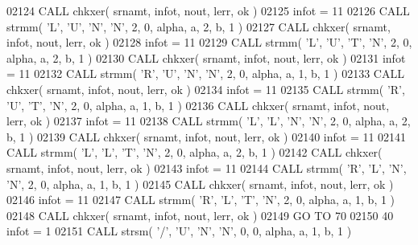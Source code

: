 \begin{DoxyCode}
02124       \textcolor{keyword}{CALL }chkxer( srnamt, infot, nout, lerr, ok )
02125       infot = 11
02126       \textcolor{keyword}{CALL }strmm( \textcolor{stringliteral}{'L'}, \textcolor{stringliteral}{'U'}, \textcolor{stringliteral}{'N'}, \textcolor{stringliteral}{'N'}, 2, 0, alpha, a, 2, b, 1 )
02127       \textcolor{keyword}{CALL }chkxer( srnamt, infot, nout, lerr, ok )
02128       infot = 11
02129       \textcolor{keyword}{CALL }strmm( \textcolor{stringliteral}{'L'}, \textcolor{stringliteral}{'U'}, \textcolor{stringliteral}{'T'}, \textcolor{stringliteral}{'N'}, 2, 0, alpha, a, 2, b, 1 )
02130       \textcolor{keyword}{CALL }chkxer( srnamt, infot, nout, lerr, ok )
02131       infot = 11
02132       \textcolor{keyword}{CALL }strmm( \textcolor{stringliteral}{'R'}, \textcolor{stringliteral}{'U'}, \textcolor{stringliteral}{'N'}, \textcolor{stringliteral}{'N'}, 2, 0, alpha, a, 1, b, 1 )
02133       \textcolor{keyword}{CALL }chkxer( srnamt, infot, nout, lerr, ok )
02134       infot = 11
02135       \textcolor{keyword}{CALL }strmm( \textcolor{stringliteral}{'R'}, \textcolor{stringliteral}{'U'}, \textcolor{stringliteral}{'T'}, \textcolor{stringliteral}{'N'}, 2, 0, alpha, a, 1, b, 1 )
02136       \textcolor{keyword}{CALL }chkxer( srnamt, infot, nout, lerr, ok )
02137       infot = 11
02138       \textcolor{keyword}{CALL }strmm( \textcolor{stringliteral}{'L'}, \textcolor{stringliteral}{'L'}, \textcolor{stringliteral}{'N'}, \textcolor{stringliteral}{'N'}, 2, 0, alpha, a, 2, b, 1 )
02139       \textcolor{keyword}{CALL }chkxer( srnamt, infot, nout, lerr, ok )
02140       infot = 11
02141       \textcolor{keyword}{CALL }strmm( \textcolor{stringliteral}{'L'}, \textcolor{stringliteral}{'L'}, \textcolor{stringliteral}{'T'}, \textcolor{stringliteral}{'N'}, 2, 0, alpha, a, 2, b, 1 )
02142       \textcolor{keyword}{CALL }chkxer( srnamt, infot, nout, lerr, ok )
02143       infot = 11
02144       \textcolor{keyword}{CALL }strmm( \textcolor{stringliteral}{'R'}, \textcolor{stringliteral}{'L'}, \textcolor{stringliteral}{'N'}, \textcolor{stringliteral}{'N'}, 2, 0, alpha, a, 1, b, 1 )
02145       \textcolor{keyword}{CALL }chkxer( srnamt, infot, nout, lerr, ok )
02146       infot = 11
02147       \textcolor{keyword}{CALL }strmm( \textcolor{stringliteral}{'R'}, \textcolor{stringliteral}{'L'}, \textcolor{stringliteral}{'T'}, \textcolor{stringliteral}{'N'}, 2, 0, alpha, a, 1, b, 1 )
02148       \textcolor{keyword}{CALL }chkxer( srnamt, infot, nout, lerr, ok )
02149       \textcolor{keywordflow}{GO TO} 70
02150    40 infot = 1
02151       \textcolor{keyword}{CALL }strsm( \textcolor{stringliteral}{'/'}, \textcolor{stringliteral}{'U'}, \textcolor{stringliteral}{'N'}, \textcolor{stringliteral}{'N'}, 0, 0, alpha, a, 1, b, 1 )

\end{DoxyCode}
